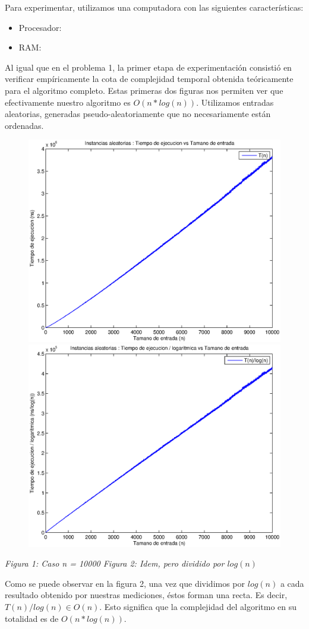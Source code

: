 Para experimentar, utilizamos una computadora con las siguientes características:

\begin{itemize}
 \item Procesador: 
 \item RAM: 
\end{itemize}

Al igual que en el problema 1, la primer etapa de experimentación consistió en verificar empíricamente la cota de complejidad temporal obtenida teóricamente para el algoritmo completo. Estas primeras dos figuras nos permiten ver que efectivamente nuestro algoritmo es $O(n * log(n))$. Utilizamos entradas aleatorias, generadas pseudo-aleatoriamente que no necesariamente están ordenadas.

\begin{figure}[H]
    \includegraphics[width=0.5\linewidth]{problema2/graficos/problema2_aleatoria_10000.eps}
    \includegraphics[width=0.5\linewidth]{problema2/graficos/problema2_aleatoria_10000_div_logn.eps}
\end{figure}
\emph{\hspace{2,5cm}Figura 1: Caso n = 10000 \hspace{2,5cm}Figura 2: Idem, pero dividido por $log(n)$}

Como se puede observar en la figura 2, una vez que dividimos por $log(n)$ a cada resultado obtenido por nuestras mediciones, éstos forman una recta. Es decir, $T(n)/log(n) \in O(n)$. Esto significa que la complejidad del algoritmo en su totalidad es de $O(n * log(n))$.
  
